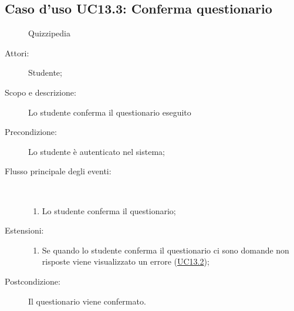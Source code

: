 \subsection{Caso d'uso UC13.3: Conferma questionario}
	\begin{figure}[H]
		\centering
		\begin{resizedtikzpicture}{\textwidth}
		\begin{umlsystem}[x=0, fill=lightgray!20]{Quizzipedia}
		\end{umlsystem}
		\end{resizedtikzpicture}
		\caption{}
	\end{figure}
\begin{description}
\item[Attori:] Studente;
\item[Scopo e descrizione:] Lo studente conferma il questionario eseguito
      \item[Precondizione:] Lo studente è autenticato nel sistema;

        \item[Flusso principale degli eventi:] \ 
 \begin{enumerate}
          \item Lo studente conferma il questionario;

      \end{enumerate}
    \item[Estensioni:]
      \begin{enumerate}
          \item Se quando lo studente conferma il questionario ci sono domande non risposte viene visualizzato un errore (\hyperlink{UC13.2}{UC13.2});

      \end{enumerate}
    \item[Postcondizione:] Il questionario viene confermato.
  \end{description}
\hypertarget{UC13.4}{}
